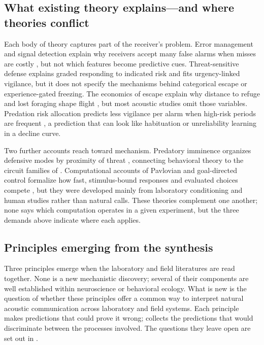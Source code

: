 \subsection{What existing theory explains---and where theories conflict}
\label{sec:account-theory}

Each body of theory captures part of the receiver's problem. Error management and signal detection explain why receivers accept many false alarms when misses are costly \citep{Nesse2005}, but not which features become predictive cues. Threat-sensitive defense explains graded responding to indicated risk \citep{Helfman1989} and fits urgency-linked vigilance, but it does not specify the mechanisms behind categorical escape or experience-gated freezing. The economics of escape explain why distance to refuge and lost foraging shape flight \citep{YdenbergDill1986,DillHoutman1989}, but most acoustic studies omit those variables. Predation risk allocation predicts less vigilance per alarm when high-risk periods are frequent \citep{LimaBednekoff1999}, a prediction that can look like habituation or unreliability learning in a decline curve.

Two further accounts reach toward mechanism. Predatory imminence organizes defensive modes by proximity of threat \citep{Fanselow1994}, connecting behavioral theory to the circuit families of . Computational accounts of Pavlovian and goal-directed control formalize how fast, stimulus-bound responses and evaluated choices compete \citep{DayanEtAl2006,RigoliEtAl2016}, but they were developed mainly from laboratory conditioning and human studies rather than natural calls. These theories complement one another; none says which computation operates in a given experiment, but the three demands above indicate where each applies.

\subsection{Principles emerging from the synthesis}
\label{sec:account-propositions}

Three principles emerge when the laboratory and field literatures are read together. None is a new mechanistic discovery; several of their components are well established within neuroscience or behavioral ecology. What is new is the question of whether these principles offer a common way to interpret natural acoustic communication across laboratory and field systems. Each principle makes predictions that could prove it wrong;  collects the predictions that would discriminate between the processes involved. The questions they leave open are set out in .


